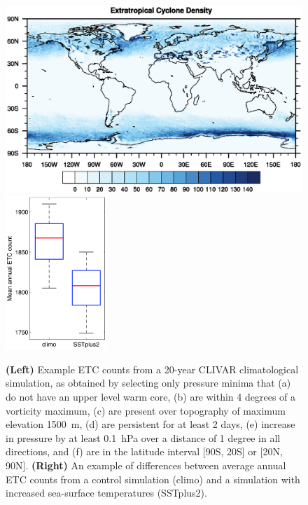 \documentclass[11pt]{article}
\begin{document}
\begin{figure}[ht]
\begin{center}
\includegraphics[trim=0.5cm 3.5cm 1cm 4.5cm, clip=true, width=4.5in]{density_plot}
\includegraphics[width=1.5in]{ETCChanges.png}
\end{center}
\caption{\textbf{(Left)} Example ETC counts from a 20-year CLIVAR climatological simulation, as obtained by selecting only pressure minima that (a) do not have an upper level warm core, (b) are within 4 degrees of a vorticity maximum, (c) are present over topography of maximum elevation 1500\ m, (d) are persistent for at least 2 days, (e) increase in pressure by  at least 0.1\ hPa over a distance of 1 degree in all directions, and (f) are in the latitude interval [90S, 20S] or [20N, 90N].  \textbf{(Right)} An example of differences between average annual ETC counts from a control simulation (climo) and a simulation with increased sea-surface temperatures (SSTplus2).} \label{fig:DensityPlot}
\end{figure}
\end{document}
